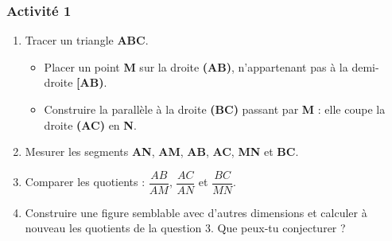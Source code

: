 \documentclass[12pt,a4paper]{article}
\begin{document}
\subsubsection*{\color{myred} Activité 1}
\begin{enumerate}
    \item Tracer un triangle \textbf{ABC}.
    \begin{itemize}
        \item[\textbullet] Placer un point \textbf{M} sur la droite \textbf{(AB)}, n'appartenant pas à la demi-droite \textbf{[AB)}.
        \item[\textbullet] Construire la parallèle à la droite \textbf{(BC)} passant par \textbf{M} : elle coupe la droite \textbf{(AC)} en \textbf{N}.
    \end{itemize}
    
    \item Mesurer les segments \textbf{AN}, \textbf{AM}, \textbf{AB}, \textbf{AC}, \textbf{MN} et \textbf{BC}.
    
    \item Comparer les quotients : $\dfrac{AB}{AM}$, $\dfrac{AC}{AN}$ et $\dfrac{BC}{MN}$.
    
    \item Construire une figure semblable avec d'autres dimensions et calculer à nouveau les quotients de la question 3. Que peux-tu conjecturer ?
\end{enumerate}
\begin{center}
\end{center}
\end{document}
